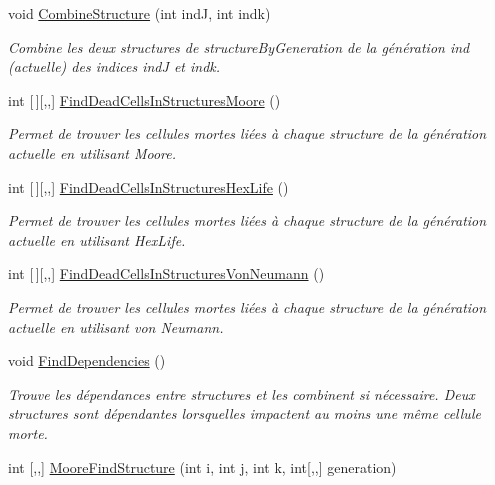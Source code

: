 \begin{DoxyCompactItemize}
void \mbox{\hyperlink{class_detection_a7a133b5ef43e949260afb4685766e0ca}{Combine\+Structure}} (int indJ, int indk)
\begin{DoxyCompactList}\small\item\em Combine les deux structures de structure\+By\+Generation de la génération ind (actuelle) des indices indJ et indk. \end{DoxyCompactList}\item 
int \mbox{[}$\,$\mbox{]}\mbox{[},,\mbox{]} \mbox{\hyperlink{class_detection_a018511f85c3fb9eca82fc06c9f4eb031}{Find\+Dead\+Cells\+In\+Structures\+Moore}} ()
\begin{DoxyCompactList}\small\item\em Permet de trouver les cellules mortes liées à chaque structure de la génération actuelle en utilisant Moore. \end{DoxyCompactList}\item 
int \mbox{[}$\,$\mbox{]}\mbox{[},,\mbox{]} \mbox{\hyperlink{class_detection_ac836468018dc40fd2261136a035eb25a}{Find\+Dead\+Cells\+In\+Structures\+Hex\+Life}} ()
\begin{DoxyCompactList}\small\item\em Permet de trouver les cellules mortes liées à chaque structure de la génération actuelle en utilisant Hex\+Life. \end{DoxyCompactList}\item 
int \mbox{[}$\,$\mbox{]}\mbox{[},,\mbox{]} \mbox{\hyperlink{class_detection_aeea8bac4d15d3dd92d6b907b357c1680}{Find\+Dead\+Cells\+In\+Structures\+Von\+Neumann}} ()
\begin{DoxyCompactList}\small\item\em Permet de trouver les cellules mortes liées à chaque structure de la génération actuelle en utilisant von Neumann. \end{DoxyCompactList}\item 
void \mbox{\hyperlink{class_detection_a0f5d7b85c0daaf07503132a2faa23bcf}{Find\+Dependencies}} ()
\begin{DoxyCompactList}\small\item\em Trouve les dépendances entre structures et les combinent si nécessaire. Deux structures sont dépendantes lorsqu\textquotesingle{}elles impactent au moins une même cellule morte. \end{DoxyCompactList}\item 
int \mbox{[},,\mbox{]} \mbox{\hyperlink{class_detection_a3d3b6bfd7fe37149108908d230fcc9f1}{Moore\+Find\+Structure}} (int i, int j, int k, int\mbox{[},,\mbox{]} generation)

\end{DoxyCompactItemize}
